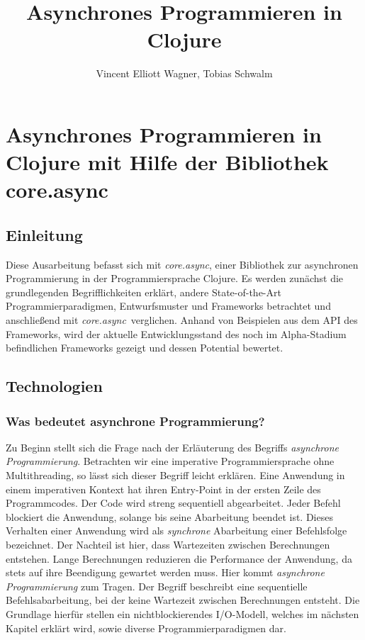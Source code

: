 \documentclass[12pt,a4paper,parskip=half,listof=totoc]{scrreprt}
\title{Asynchrones Programmieren in Clojure}
\author{Vincent Elliott Wagner, Tobias Schwalm}
\newcommand{\CA}{\textit{core.async}}
\begin{document}
\maketitle
\newpage

\setcounter{page}{1}

\setcounter{last_roman}{\value{page}}

\chapter{Asynchrones Programmieren in Clojure mit Hilfe der Bibliothek core.async}
\section{Einleitung}
Diese Ausarbeitung befasst sich mit \CA , einer Bibliothek zur asynchronen Programmierung in der Programmiersprache Clojure. Es werden zunächst die grundlegenden Begrifflichkeiten erklärt, andere State-of-the-Art Programmierparadigmen, Entwurfsmuster und Frameworks betrachtet und anschließend mit \CA\ verglichen. Anhand von Beispielen aus dem \acf{API} des Frameworks, wird der aktuelle Entwicklungsstand des noch im Alpha-Stadium befindlichen Frameworks gezeigt und dessen Potential bewertet.
\section{Technologien}
\subsection{Was bedeutet asynchrone Programmierung?}
Zu Beginn stellt sich die Frage nach der Erläuterung des Begriffs \textit{asynchrone Programmierung}. Betrachten wir eine imperative Programmiersprache ohne Multithreading, so lässt sich dieser Begriff leicht erklären. Eine Anwendung in einem imperativen Kontext hat ihren Entry-Point in der ersten Zeile des Programmcodes. Der Code wird streng sequentiell abgearbeitet. Jeder Befehl blockiert die Anwendung, solange bis seine Abarbeitung beendet ist. Dieses Verhalten einer Anwendung wird als \textit{synchrone} Abarbeitung einer Befehlsfolge bezeichnet. Der Nachteil ist hier, dass Wartezeiten zwischen Berechnungen entstehen. Lange Berechnungen reduzieren die Performance der Anwendung, da stets auf ihre Beendigung gewartet werden muss. Hier kommt \textit{asynchrone Programmierung} zum Tragen. Der Begriff beschreibt eine sequentielle Befehlsabarbeitung, bei der keine Wartezeit zwischen Berechnungen entsteht. Die Grundlage hierfür stellen ein nichtblockierendes I/O-Modell, welches im nächsten Kapitel erklärt wird, sowie diverse Programmierparadigmen dar.
\end{document}
